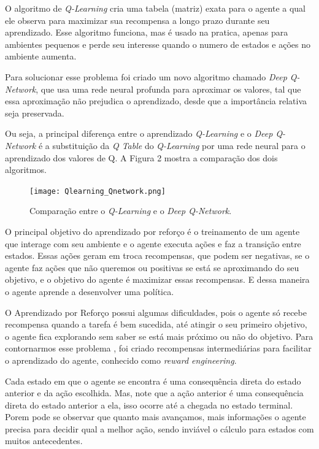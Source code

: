 \documentclass[letterpaper, 10 pt, conference]{ieeeconf}  %
\begin{document}
O algoritmo de \emph{Q-Learning} cria uma tabela (matriz) exata para o agente a qual ele observa para maximizar sua recompensa a longo prazo durante seu aprendizado. Esse algoritmo funciona, mas é usado na pratica, apenas para ambientes pequenos e perde seu interesse quando o numero de estados e ações no ambiente aumenta.

Para solucionar esse problema foi criado um novo algoritmo chamado \emph{Deep Q-Network}, que usa uma rede neural profunda para aproximar os valores, tal que essa aproximação não prejudica o aprendizado, desde que a importância relativa seja preservada. 

Ou seja, a principal diferença entre o aprendizado \emph{Q-Learning} e o \emph{Deep Q-Network} é a substituição da \emph{Q Table} do \emph{Q-Learning} por uma rede neural para o aprendizado dos valores de Q. A Figura 2 mostra a comparação dos dois algoritmos.

\begin{figure}[H]
\centering
\texttt{[image: Qlearning\_Qnetwork.png]}
\caption{Comparação entre o \emph{Q-Learning} e o \emph{Deep Q-Network}.}
\label{fig:comparacao}
\end{figure}

O principal  objetivo do aprendizado por reforço é o treinamento de um agente que interage com seu ambiente e o agente executa ações e faz a  transição entre estados. Essas ações geram em troca recompensas, que podem ser negativas, se o agente faz ações que não queremos ou positivas se está se aproximando do seu objetivo, e o objetivo do agente é maximizar essas recompensas. E dessa maneira o agente aprende a desenvolver uma política. 

O Aprendizado por Reforço possui algumas dificuldades, pois o agente só recebe recompensa quando a tarefa é bem sucedida, até atingir o seu primeiro objetivo, o agente fica explorando sem saber se está mais próximo ou não do objetivo. Para contornarmos esse problema , foi criado recompensas intermediárias para facilitar o aprendizado do agente, conhecido como \emph{reward engineering}.

Cada estado em que o agente se encontra é uma consequência direta do estado anterior e da ação escolhida. Mas, note que a ação anterior é uma consequência direta do estado anterior a ela, isso ocorre até a chegada no estado terminal. Porem pode se observar que quanto mais avançamos, mais informações o agente precisa para decidir qual a melhor ação, sendo inviável o cálculo para estados com muitos antecedentes.
\end{document}
